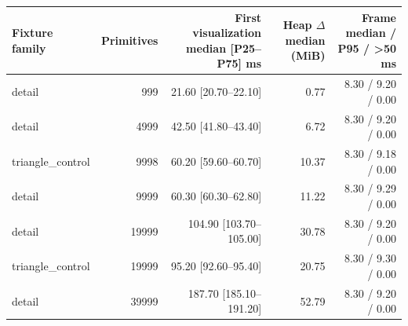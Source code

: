 \begin{tabular}{lrrrr}
\hline
Fixture family & Primitives & First visualization median [P25--P75] ms & Heap \ensuremath{\Delta} median (MiB) & Frame median / P95 / >50 ms \\
\hline
detail & 999 & 21.60 [20.70--22.10] & 0.77 & 8.30 / 9.20 / 0.00 \\
detail & 4999 & 42.50 [41.80--43.40] & 6.72 & 8.30 / 9.20 / 0.00 \\
triangle\_control & 9998 & 60.20 [59.60--60.70] & 10.37 & 8.30 / 9.18 / 0.00 \\
detail & 9999 & 60.30 [60.30--62.80] & 11.22 & 8.30 / 9.29 / 0.00 \\
detail & 19999 & 104.90 [103.70--105.00] & 30.78 & 8.30 / 9.20 / 0.00 \\
triangle\_control & 19999 & 95.20 [92.60--95.40] & 20.75 & 8.30 / 9.30 / 0.00 \\
detail & 39999 & 187.70 [185.10--191.20] & 52.79 & 8.30 / 9.20 / 0.00 \\
\hline
\end{tabular}

